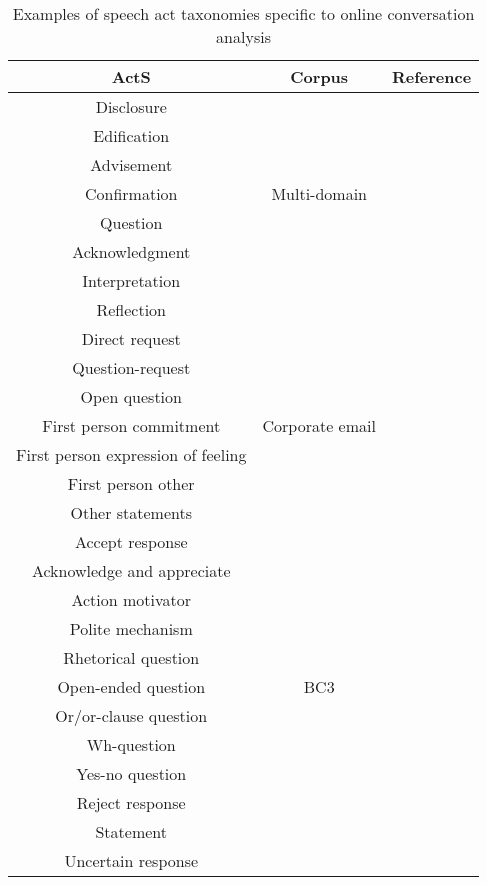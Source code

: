 \begin{table}
	\begin{tabularx}{\textwidth}{c c c}
		\toprule
		ActS & Corpus & Reference \\
		\midrule
		Disclosure &  & \\
		Edification &  & \\
		Advisement &  & \\
		Confirmation & Multi-domain & \cite{Lampert_classifyingspeech} \\
		Question &  & \\
		Acknowledgment &  & \\
		Interpretation &  & \\
		Reflection &  & \\
		\midrule
		Direct request &  & \\
		Question-request &  & \\
		Open question &  & \\
		First person commitment & Corporate email & \cite{de2013classification} \\
		First person expression of feeling &  & \\
		First person other &  & \\
		Other statements &  & \\
		\midrule
		Accept response &  & \\
		Acknowledge and appreciate &  & \\
		Action motivator &  & \\
		Polite mechanism &  & \\
		Rhetorical question &  & \\
		Open-ended question & BC3 & \cite{JanAAAI08} \\
		Or/or-clause question &  & \\
		Wh-question &  & \\
		Yes-no question &  & \\
		Reject response &  & \\
		Statement &  & \\
		Uncertain response &  & \\
		\bottomrule
	\end{tabularx}
	\caption{Examples of speech act taxonomies specific to online conversation analysis}
	\label{fig:emailTaxonomies}
\end{table}